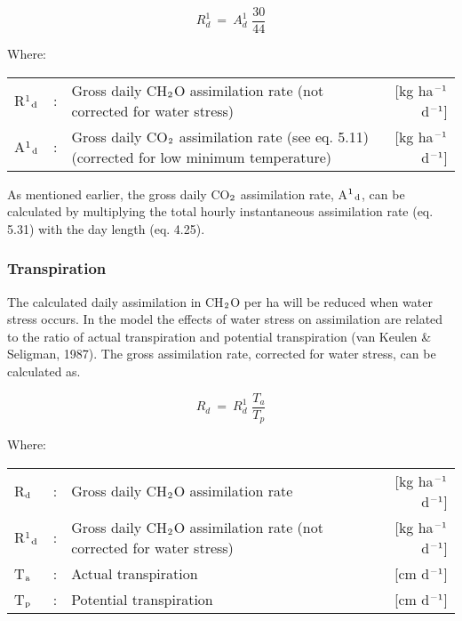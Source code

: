 \begin{equation}
R _{d}^{1} ~=~ A _{d}^{1} \,\,{\frac{30}{44}}
\end{equation}

Where:\\[5pt]
\begin{tabularx}{\textwidth}{llXr}
R$^{{\rm 1}}$$_{{\rm d}}$ &:& Gross daily CH$_{{\rm 2}}$O assimilation rate 
   (not corrected for water stress) &   [kg ha$^{{\rm -1}}$ d$^{{\rm -1}}$]\\
A$^{{\rm 1}}$$_{{\rm d}}$ &:& Gross daily CO$_{{\rm 2}}$ assimilation rate 
   (see eq. 5.11) (corrected for low minimum temperature)   &    [kg ha$^{{\rm -1}}$ d$^{{\rm -1}}$]\\   
\end{tabularx}
 
As mentioned earlier, the gross daily CO$_{{\rm 2}}$ assimilation rate, A$^{{\rm 1}}$$_{{\rm d}}$, can be calculated by
multiply\-ing the total hourly instantaneous assimilation rate (eq. 5.31) with the day length
(eq. 4.25). 

\subsubsection{Transpiration}
The calculated daily assimilation in CH$_{{\rm 2}}$O per ha will be reduced when water stress
occurs. In the model the effects of water stress on assimilation are related to the ratio of
actual transpiration and potential transpiration (van Keulen \& Seligman, 1987).
The gross assimilation rate, corrected for water stress, can be calculated as.

\begin{equation}
R _{d} ~=~ R _{d}^{1} \,\,{\frac{T _{a} }{T _{p} }}
\end{equation}

Where:\\[5pt]
\begin{tabularx}{\textwidth}{llXr}
R$_{{\rm d}}$ &:& Gross daily CH$_{{\rm 2}}$O assimilation rate   &     [kg ha$^{{\rm -1}}$ d$^{{\rm -1}}$]\\
R$^{{\rm 1}}$$_{{\rm d}}$ &:& Gross daily CH$_{{\rm 2}}$O assimilation rate
   (not corrected for water stress)   &     [kg ha$^{{\rm -1}}$ d$^{{\rm -1}}$]\\
T$_{{\rm a}}$ &:& Actual transpiration   &     [cm d$^{{\rm -1}}$]\\
T$_{{\rm p}}$ &:& Potential transpiration   &     [cm d$^{{\rm -1}}$]\\
\end{tabularx}

